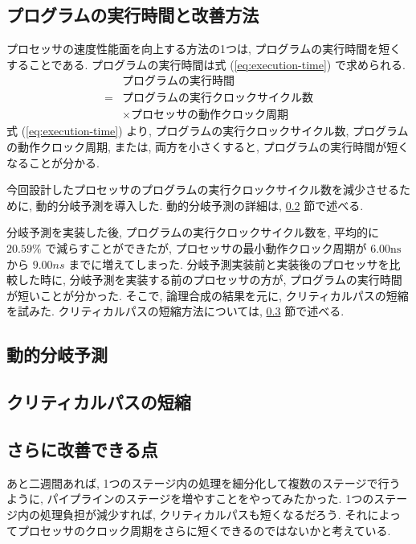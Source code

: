 \documentclass[../main.tex]{subfiles}
\begin{document}
  \subsection{プログラムの実行時間と改善方法}
  プロセッサの速度性能面を向上する方法の1つは, プログラムの実行時間を短くすることである.
  プログラムの実行時間は式 (\ref{eq:execution-time}) で求められる.
  \begin{equation}
    \begin{aligned}
      &プログラムの実行時間 \\
      = &プログラムの実行クロックサイクル数 \\
      &\times プロセッサの動作クロック周期
      \label{eq:execution-time}
    \end{aligned}
  \end{equation}
  式 (\ref{eq:execution-time}) より, プログラムの実行クロックサイクル数, プログラムの動作クロック周期, 
  または, 両方を小さくすると, プログラムの実行時間が短くなることが分かる.

  今回設計したプロセッサのプログラムの実行クロックサイクル数を減少させるために, 動的分岐予測を導入した.
  動的分岐予測の詳細は, \ref{subsection:jump-prediction} 節で述べる.

  分岐予測を実装した後, プログラムの実行クロックサイクル数を, 
  平均的に $20.59\%$ で減らすことができたが, 
  プロセッサの最小動作クロック周期が $6.00\unit{\ns}$ から $9.00\unit{ns}$ までに増えてしまった.
  分岐予測実装前と実装後のプロセッサを比較した時に, 
  分岐予測を実装する前のプロセッサの方が, 
  プログラムの実行時間が短いことが分かった.
  そこで, 論理合成の結果を元に, クリティカルパスの短縮を試みた.
  クリティカルパスの短縮方法については, \ref{subsection:critical-path} 節で述べる.

  \subsection{動的分岐予測} \label{subsection:jump-prediction}
  

  \subsection{クリティカルパスの短縮} \label{subsection:critical-path}
  

  \subsection{さらに改善できる点}
  あと二週間あれば, 1つのステージ内の処理を細分化して複数のステージで行うように, 
  パイプラインのステージを増やすことをやってみたかった.
  1つのステージ内の処理負担が減少すれば, クリティカルパスも短くなるだろう.
  それによってプロセッサのクロック周期をさらに短くできるのではないかと考えている.
\end{document}
